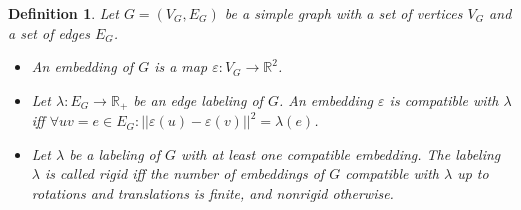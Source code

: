 \documentclass[a1paper, portrait]{tikzposter} %
\newtheorem{defn}{Definition}
\newcommand{\RR}{\mathbb{R}}
\begin{document}
\begin{columns}
{\begin{defn}
Let $G=(V_G,E_G)$ be a simple graph with a set of vertices $V_G$ and a set of edges $E_G$. 
\begin{itemize}
	\item An \emph{embedding} of $G$ is a map $\varepsilon:V_G\rightarrow \RR^2$. 
	\item  Let $\lambda:E_G\rightarrow \RR_+$ be an edge labeling of $G$. An embedding $\varepsilon$ is \emph{compatible with} $\lambda$ iff $\forall uv=e\in E_G \colon ||\varepsilon(u)-\varepsilon(v)||^2=\lambda(e)$.
	\item Let $\lambda$ be a labeling of $G$ with at least one compatible embedding. The labeling $\lambda$ is called \emph{rigid} iff the number of embeddings of $G$ compatible with $\lambda$ up to rotations and translations is finite, and \emph{nonrigid} otherwise.
\end{itemize} 
\end{defn}


}
\end{columns}
\end{document}
